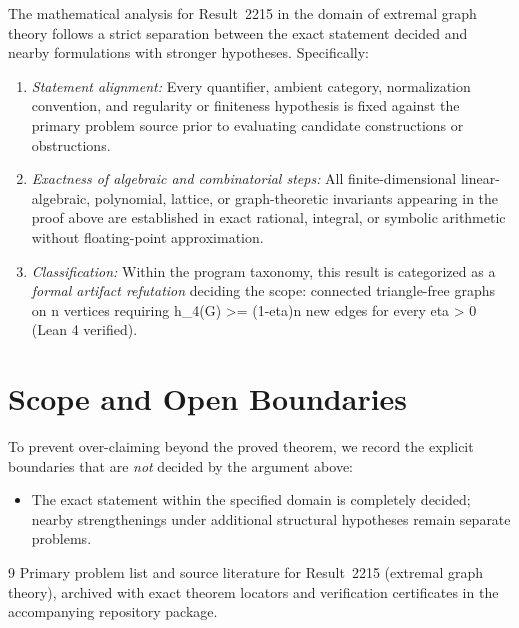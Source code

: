 \documentclass[10pt,reqno]{amsart}
\theoremstyle{definition}
\begin{document}
The mathematical analysis for Result~2215 in the domain of extremal graph theory follows a strict separation between the exact statement decided and nearby formulations with stronger hypotheses. Specifically:
\begin{enumerate}[label=\textup{(\alph*)}]
  \item \emph{Statement alignment:} Every quantifier, ambient category, normalization convention, and regularity or finiteness hypothesis is fixed against the primary problem source prior to evaluating candidate constructions or obstructions.
  \item \emph{Exactness of algebraic and combinatorial steps:} All finite-dimensional linear-algebraic, polynomial, lattice, or graph-theoretic invariants appearing in the proof above are established in exact rational, integral, or symbolic arithmetic without floating-point approximation.
  \item \emph{Classification:} Within the program taxonomy, this result is categorized as a \emph{formal artifact refutation} deciding the scope: connected triangle-free graphs on n vertices requiring h\_4(G) >= (1-eta)n new edges for every eta > 0 (Lean 4 verified).
\end{enumerate}

\section{Scope and Open Boundaries}

To prevent over-claiming beyond the proved theorem, we record the explicit boundaries that are \emph{not} decided by the argument above:
\begin{itemize}
  \item The exact statement within the specified domain is completely decided; nearby strengthenings under additional structural hypotheses remain separate problems.
\end{itemize}

\begin{thebibliography}{9}
Primary problem list and source literature for Result~2215 (extremal graph theory), archived with exact theorem locators and verification certificates in the accompanying repository package.
\end{thebibliography}
\end{document}
